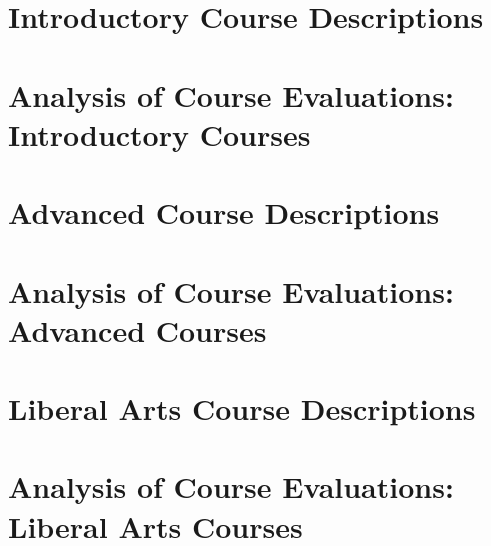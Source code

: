 \documentclass[../../main.tex]{subfiles}
\begin{document}
\section{Introductory Course Descriptions}
\label{sec:intro}

\begin{flushleft}

\end{flushleft}

\section{Analysis of Course Evaluations: Introductory Courses}
\label{sec:intro_eval}

\begin{flushleft}

\end{flushleft}

\section{Advanced Course Descriptions}
\label{sec:adv}

\begin{flushleft}

\end{flushleft}

\section{Analysis of Course Evaluations: Advanced Courses}
\label{sec:adv_eval}

\begin{flushleft}

\end{flushleft}

\section{Liberal Arts Course Descriptions}
\label{sec:lib}

\begin{flushleft}

\end{flushleft}

\section{Analysis of Course Evaluations: Liberal Arts Courses}
\label{sec:lib_eval}
\end{document}
